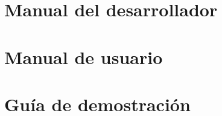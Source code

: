 \null\vfill

\appendix

\chapter{Manual del desarrollador}

\newpage{\ }
\cleardoublepage

\chapter{Manual de usuario}


\newpage{\ }
\cleardoublepage

\chapter{Guía de demostración}


